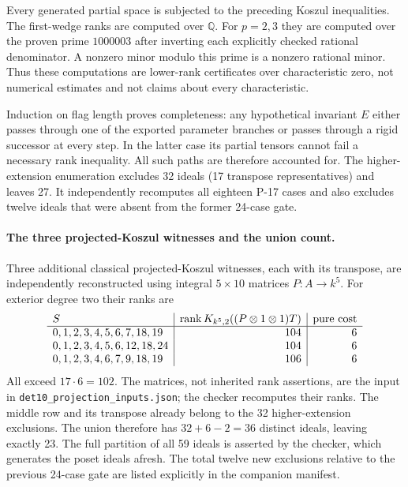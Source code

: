 Every generated partial space is subjected to the preceding Koszul
inequalities.  The first-wedge ranks are computed over $\mathbb Q$.
For $p=2,3$ they are computed over the proven prime $1000003$ after
inverting each explicitly checked rational denominator.  A nonzero
minor modulo this prime is a nonzero rational minor.  Thus these
computations are lower-rank certificates over characteristic zero,
not numerical estimates and not claims about every characteristic.

Induction on flag length proves completeness: any hypothetical invariant
$E$ either passes through one of the exported parameter branches or
passes through a rigid successor at every step.  In the latter case its
partial tensors cannot fail a necessary rank inequality.  All such paths
are therefore accounted for.  The higher-extension enumeration excludes
32 ideals (17 transpose representatives) and leaves 27.  It independently
recomputes all eighteen P-17 cases and also excludes twelve ideals that
were absent from the former 24-case gate.

\paragraph{The three projected-Koszul witnesses and the union count.}
Three additional classical projected-Koszul witnesses, each with its
transpose, are independently reconstructed using integral $5\times10$
matrices $P:A\to k^5$.  For exterior degree two their ranks are
\[
\begin{array}{l|r|r}
S&\operatorname{rank} K_{k^5,2}((P\otimes1\otimes1)T)&\text{pure cost}\\\hline
0,1,2,3,4,5,6,7,18,19&104&6\\
0,1,2,3,4,5,6,12,18,24&104&6\\
0,1,2,3,4,6,7,9,18,19&106&6
\end{array}
\]
All exceed $17\cdot6=102$.  The matrices, not inherited rank assertions,
are the input in \texttt{det10\_projection\_inputs.json}; the checker
recomputes their ranks.  The middle row and its transpose already belong
to the 32 higher-extension exclusions.  The union therefore has
$32+6-2=36$ distinct ideals, leaving exactly 23.  The full partition of
all 59 ideals is asserted by the checker, which generates the poset ideals
afresh.  The total twelve new exclusions relative to the previous 24-case
gate are listed explicitly in the companion manifest.

